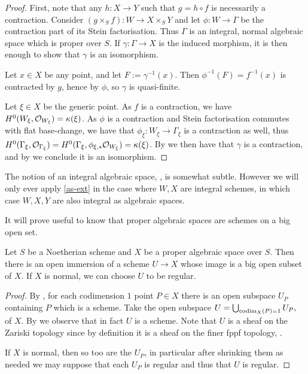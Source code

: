 	\begin{proof}
		First, note that any $h\colon X\to Y$ such that $g=h \circ f$ is necessarily a contraction.
		Consider $(g\times_S f)\colon W \to X \times_S Y$ and let $\phi \colon W \to \Gamma$ be the contraction part of its Stein factorisation.
		Thus $\Gamma$ is an integral, normal algebraic space which is proper over $S$. If $\gamma\colon \Gamma\to X$ is the induced morphism, it is then enough to show that $\gamma$ is an isomorphism.
		
		Let $x\in X$ be any point, and let $F:=\gamma^{-1}(x)$. Then $\phi^{-1}(F)=f^{-1}(x)$ is contracted by $g$, hence by $\phi$, so $\gamma$ is quasi-finite.
		
		Let $\xi\in X$ be the generic point. As $f$ is a contraction, we have $H^0(W_\xi,\mathcal{O}_{W_\xi})=\kappa(\xi)$. As $\phi$ is a contraction and Stein factorisation commutes with flat base-change, we have that $\phi_\xi\colon W_\xi\to\Gamma_\xi$ is a contraction as well, thus $H^0(\Gamma_\xi,\mathcal{O}_{\Gamma_\xi})=H^0(\Gamma_\xi,\phi_{\xi,*}\mathcal{O}_{W_\xi})=\kappa(\xi)$. By \cite[\href{https://stacks.math.columbia.edu/tag/0AYI}{Tag 0AYI}]{stacks-project} we then have that $\gamma$ is a contraction, and by \cite[\href{https://stacks.math.columbia.edu/tag/082I}{Tag 082I}]{stacks-project} we conclude it is an isomorphism.
	\end{proof}
	
	\begin{remark}
		The notion of an integral algebraic space, \cite[Tag 0AD3]{stacks-project}, is somewhat subtle. However we will only ever apply \autoref{as-ext} in the case where $W,X$ are integral schemes, in which case $W,X,Y$ are also integral as algebraic spaces.
	\end{remark}
	
	It will prove useful to know that proper algebraic spaces are schemes on a big open set.
	
	\begin{lemma}\label{l-cod1}
		Let $S$ be a Noetherian scheme and $X$ be a proper algebraic space over $S$. 
		Then there is an open immersion of a scheme $U\to X$ whose image is a big open subset of $X$. 
		If $X$ is normal, we can choose $U$ to be regular.
	\end{lemma}
	
	\begin{proof}
		By , for each codimension $1$ point $P \in X$ there is an open subspace $U_{P}$ containing $P$ which is a scheme.
		Take the open subspace   $U=\bigcup_{\textup{codim}_X(P)=1} U_{P},$
		of $X$.
		By \cite[\href{https://stacks.math.columbia.edu/tag/01JJ}{Tag 01JJ}]{stacks-project} we observe that in fact $U$ is a scheme. Note that $U$ is a sheaf on the Zariski topology since by definition it is a sheaf on the finer fppf topology, . 
		
		If $X$ is normal, then so too are the $U_{P}$, in particular after shrinking them as needed we may suppose that each $U_{P}$ is regular and thus that $U$ is regular.
	\end{proof}
	
